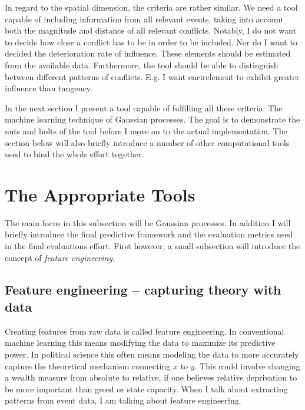 \documentclass[a4paper]{article}
\begin{document}
In regard to the spatial dimension, the criteria are rather similar. We need a tool capable of including information from all relevant events, taking into account both the magnitude and distance of all relevant conflicts. Notably, I do not want to decide how close a conflict has to be in order to be included. Nor do I want to decided the deterioration rate of influence. These elements should be estimated from the available data. Furthermore, the tool should be able to distinguish between different patterns of conflicts. E.g. I want encirclement to exhibit greater influence than tangency.\par

In the next section I present a tool capable of fulfilling all these criteria: The machine learning technique of Gaussian processes. The goal is to demonstrate the nuts and bolts of the tool before I move on to the actual implementation. The section below will also briefly introduce a number of other computational tools used to bind the whole effort together.\par


\section{The Appropriate Tools}\label{tools}


The main focus in this subsection will be Gaussian processes. In addition I will briefly introduce the final predictive framework and the evaluation metrics used in the final evaluations effort. First however, a small subsection will introduce the concept of \emph{feature engineering}.\par

\subsection{Feature engineering -- capturing theory with data} %

Creating features from raw data is called feature engineering. In conventional machine learning this means modifying the data to maximize its predictive power. In political science this often means modeling the data to more accurately capture the theoretical mechanism connecting $x$ to $y$. This could involve changing a wealth measure from absolute to relative, if one believes relative deprivation to be more important than greed or state capacity. When I talk about extracting patterns from event data, I am talking about feature engineering.\par
\end{document}

